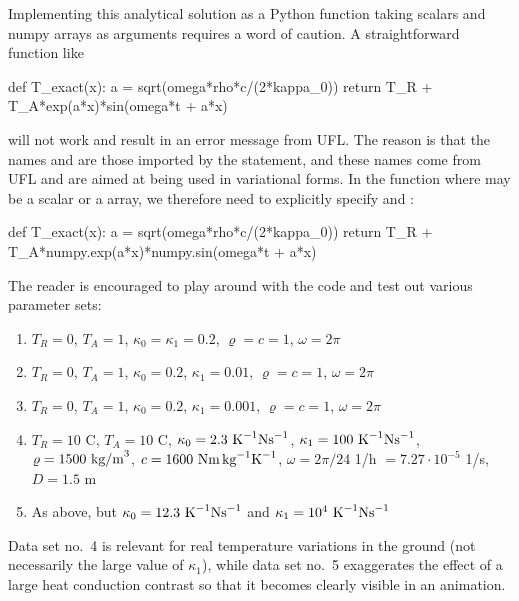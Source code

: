 Implementing this analytical solution as a Python function
taking scalars and numpy arrays as arguments requires a word of caution.
A straightforward function like
\begin{python}
def T_exact(x):
    a = sqrt(omega*rho*c/(2*kappa_0))
    return T_R + T_A*exp(a*x)*sin(omega*t + a*x)
\end{python}
will not work and result in an error message from UFL. The reason is that
the names  and  are those imported
by the  statement, and these names
come from UFL and are aimed at being used in variational forms.
In the  function where  may be a scalar or a
 array, we therefore need to explicitly specify
 and :
\begin{python}
def T_exact(x):
    a = sqrt(omega*rho*c/(2*kappa_0))
    return T_R + T_A*numpy.exp(a*x)*numpy.sin(omega*t + a*x)
\end{python}

The reader
is encouraged to play around with the code and test out various parameter
sets:
\begin{enumerate}
\item $T_R=0$, $T_A=1$, $\kappa_0 = \kappa_1=0.2$, $\varrho = c = 1$, $\omega = 2\pi$
\item $T_R=0$, $T_A=1$, $\kappa_0=0.2$, $\kappa_1=0.01$, $\varrho = c = 1$, $\omega = 2\pi$
\item $T_R=0$, $T_A=1$, $\kappa_0=0.2$, $\kappa_1=0.001$, $\varrho = c = 1$, $\omega = 2\pi$
\item $T_R=10$ C, $T_A=10$ C,
$\kappa_0= 2.3 \hbox{ K}^{-1}\hbox{Ns}^{-1}$,
$\kappa_1= 100 \hbox{ K}^{-1}\hbox{Ns}^{-1}$,
$\varrho = 1500\hbox{ kg/m}^3$,
$c = 1600\hbox{ Nm\,kg}^{-1}\hbox{K}^{-1}$,
$\omega = 2\pi/24$ 1/h  $= 7.27\cdot 10^{-5}$ 1/s, $D=1.5$ m
\item As above, but $\kappa_0= 12.3 \hbox{ K}^{-1}\hbox{Ns}^{-1}$ and
$\kappa_1= 10^4 \hbox{ K}^{-1}\hbox{Ns}^{-1}$
\end{enumerate}
Data set no.~4 is relevant for real temperature variations in
the ground (not necessarily the large value of $\kappa_1$), while data set no.~5
exaggerates the effect of a large heat conduction contrast so that
it becomes clearly visible in an animation.


